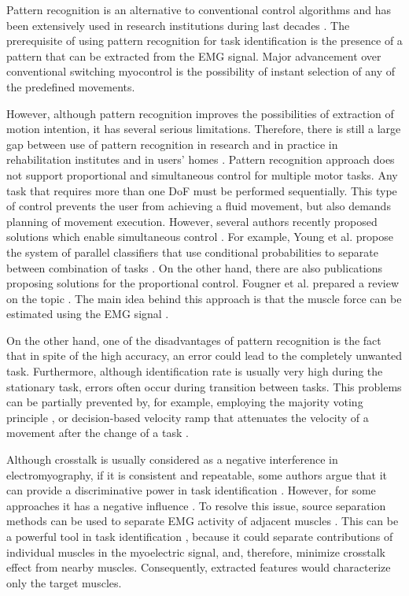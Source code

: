 Pattern recognition is an alternative to conventional control algorithms and has been extensively used in research institutions during last decades \citep{Hakonen2015, Farina2014, Nazmi2016}. The prerequisite of using pattern recognition for task identification is the presence of a pattern that can be extracted from the EMG signal. Major advancement over conventional switching myocontrol is the possibility of instant selection of any of the predefined movements.

However, although pattern recognition improves the possibilities of extraction of motion intention, it has several serious limitations. Therefore, there is still a large gap between use of pattern recognition in research and in practice in rehabilitation institutes and in users' homes \citep{Jiang2012}. Pattern recognition approach does not support proportional and simultaneous control for multiple motor tasks. Any task that requires more than one DoF must be performed sequentially. This type of control prevents the user from achieving a fluid movement, but also demands planning of movement execution. However, several authors recently proposed solutions which enable simultaneous control \citep{Young2013, Kamavuako2013, Baker2010}. For example, Young et al. propose the system of parallel classifiers that use conditional probabilities to separate between combination of tasks \citep{Young2013}. On the other hand, there are also publications proposing solutions for the proportional control. Fougner et al. prepared a review on the topic \citep{Fougner2012}. The main idea behind this approach is that the muscle force can be estimated using the EMG signal \citep{Staudenmann2010}. 

On the other hand, one of the disadvantages of pattern recognition is the fact that in spite of the high accuracy, an error could lead to the completely unwanted task. Furthermore, although identification rate is usually very high during the stationary task, errors often occur during transition between tasks. This problems can be partially prevented by, for example, employing the majority voting principle \citep{Englehart2003}, or decision-based velocity ramp that attenuates the velocity of a movement after the change of a task \citep{Simon2011}. %

Although crosstalk is usually considered as a negative interference in electromyography, if it is consistent and repeatable, some authors argue that it can provide a discriminative power in task identification \citep{Farina2014}. However, for some approaches it has a negative influence \citep{He2015}. To resolve this issue, source separation methods can be used to separate EMG activity of adjacent muscles \citep{Farina2004, Holobar2014}. This can be a powerful tool in task identification \citep{Naik2007}, because it could separate contributions of individual muscles in the myoelectric signal, and, therefore, minimize crosstalk effect from nearby muscles. Consequently, extracted features would characterize only the target muscles.


